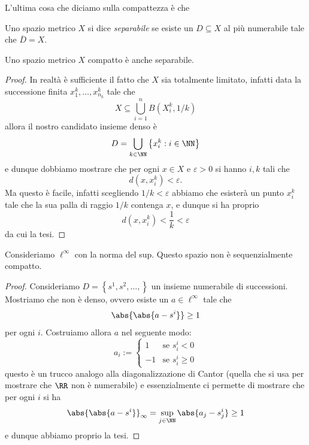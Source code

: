\documentclass[11pt]{scrartcl}
\begin{document}
	L'ultima cosa che diciamo sulla compattezza è che
	\begin{definition}[Separabilità]
		Uno spazio metrico $X$ si dice \textit{separabile} se esiste un $D\subseteq X$ al più numerabile tale che $\overline{D}=X$.
	\end{definition} 
	\begin{proposition}
		Uno spazio metrico $X$ compatto è anche separabile. 
	\end{proposition}
	\begin{proof}
		In realtà è sufficiente il fatto che $X$ sia totalmente limitato, infatti data la successione finita $x_1^k,\dots,x_{n_k}^k$ tale che
		$$X\subseteq \bigcup_{i=1}^n B(X_i^k,1/k)$$
		allora il nostro candidato insieme denso è
		$$D=\bigcup_{k\in\NN}\left\{x_i^k:i\in \NN\right\}$$
		e dunque dobbiamo mostrare che per ogni $x\in X$ e $\varepsilon>0$ si hanno $i,k$ tali che
		$$d(x,x_i^k)<\varepsilon.$$
		Ma questo è facile, infatti scegliendo $1/k<\varepsilon$ abbiamo che esisterà un punto $x_i^k$ tale che la sua palla di raggio $1/k$ contenga $x$, e dunque si ha proprio 
		$$d(x,x_i^k)<\frac{1}{k}<\varepsilon$$
		da cui la tesi.
	\end{proof}
	\begin{example}
		Consideriamo $\ell^\infty$ con la norma del sup. Questo spazio non è sequenzialmente compatto.
	\end{example}
	\begin{proof}
		Consideriamo $D=\left\{s^1,s^2,\dots,\right\}$ un insieme numerabile di successioni. Mostriamo che non è denso, ovvero esiste un $a\in \ell^\infty$ tale che
		$$\abs{\abs{a-s^i}}\ge 1$$
		per ogni $i$. Costruiamo allora $a$ nel seguente modo:
		$$a_i:=\begin{cases}
			1 & \text{se $s_i^i< 0$} \\
			-1 & \text{se $s_i^i\ge 0$}
		\end{cases}$$
		questo è un trucco analogo alla diagonalizzazione di Cantor (quella che si usa per mostrare che $\RR$ non è numerabile) e essenzialmente ci permette di mostrare che per ogni $i$ si ha
		$$\abs{\abs{a-s^i}}_\infty= \sup_{j\in \NN}\abs{a_j-s^i_j}\ge 1$$
		e dunque abbiamo proprio la tesi.
	\end{proof}
\end{document}
